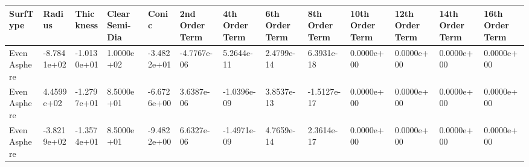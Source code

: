\documentclass[convert={convertexe={magick.exe}}]{standalone}
\begin{document}
\begin{tabular}{lllllllllllll}
\toprule
    SurfType &      Radius &   Thickness &  Clear Semi-Dia &       Conic &  2nd Order Term &  4th Order Term &  6th Order Term &  8th Order Term &  10th Order Term &  12th Order Term &  14th Order Term &  16th Order Term \\
\midrule
Even Asphere & -8.7841e+02 & -1.0130e+01 &      1.0000e+02 & -3.4822e+01 &     -4.7767e-06 &      5.2644e-11 &      2.4799e-14 &      6.3931e-18 &       0.0000e+00 &       0.0000e+00 &       0.0000e+00 &       0.0000e+00 \\
Even Asphere &  4.4599e+02 & -1.2797e+01 &      8.5000e+01 & -6.6726e+00 &      3.6387e-06 &     -1.0396e-09 &      3.8537e-13 &     -1.5127e-17 &       0.0000e+00 &       0.0000e+00 &       0.0000e+00 &       0.0000e+00 \\
Even Asphere & -3.8219e+02 & -1.3574e+01 &      8.5000e+01 & -9.4822e+00 &      6.6327e-06 &     -1.4971e-09 &      4.7659e-14 &      2.3614e-17 &       0.0000e+00 &       0.0000e+00 &       0.0000e+00 &       0.0000e+00 \\
\bottomrule
\end{tabular}
\end{document}
